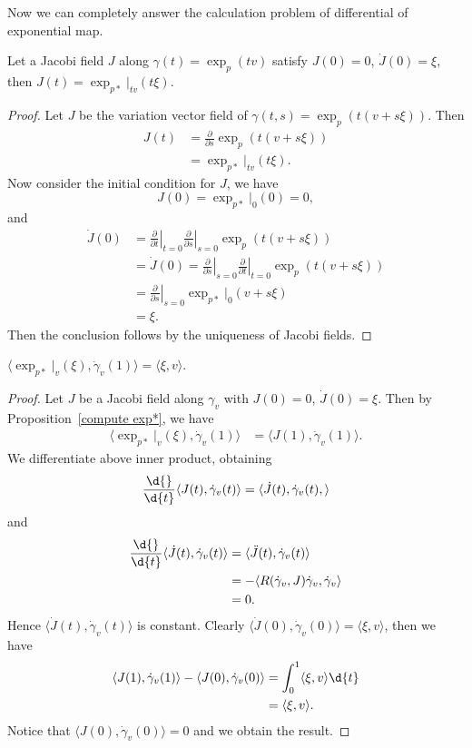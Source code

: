 Now we can completely answer the calculation problem of differential of exponential map.
\begin{prop}\label{compute exp*}
    Let a Jacobi field $J$ along $\gamma(t)=\exp_p(tv)$ satisfy $J(0)=0$, $\dot{J}(0)=\xi$, then $J(t)=\exp_{p*}|_{tv}(t\xi)$.
\end{prop}
\begin{proof}
    Let $J$ be the variation vector field of $\gamma(t,s)=\exp_p(t(v+s\xi))$.
    Then
    \begin{align*}
        J(t)&=\frac{\partial{}}{\partial{s}}\exp_p(t(v+s\xi))\\
        &=\exp_{p*}|_{tv}(t\xi).
    \end{align*}
    Now consider the initial condition for $J$, we have
    \[J(0)=\exp_{p*}|_0(0)=0,\]
    and
    \begin{align*}
        \dot{J}(0)&=\left.\frac{\partial}{\partial{t}}\right|_{t=0}\left.\frac{\partial{}}{\partial{s}}\right|_{s=0}\exp_p(t(v+s\xi))\\
        &=\dot{J}(0)=\left.\frac{\partial}{\partial{s}}\right|_{s=0}\left.\frac{\partial{}}{\partial{t}}\right|_{t=0}\exp_p(t(v+s\xi))\\
        &=\left.\frac{\partial{}}{\partial{s}}\right|_{s=0}\exp_{p*}|_0(v+s\xi)\\
        &=\xi.
    \end{align*}
    Then the conclusion follows by the uniqueness of Jacobi fields.
\end{proof}

\begin{prop}
    $\langle\exp_{p*}|_v(\xi),\dot\gamma_v(1)\rangle=\langle\xi,v\rangle$.
\end{prop}
\begin{proof}
    Let $J$ be a Jacobi field along $\gamma_v$ with $J(0)=0$, $\dot{J}(0)=\xi$.
    Then by Proposition~\ref{compute exp*}, we have
    \begin{align*}
        \langle\exp_{p*}|_v(\xi),\dot\gamma_v(1)\rangle&=\langle J(1),\dot\gamma_v(1)\rangle.
    \end{align*}
    We differentiate above inner product, obtaining
    \[\frac{\d{}}{\d{t}}\langle J(t),\dot\gamma_v(t)\rangle=\langle\dot{J}(t),\dot\gamma_v(t),\rangle\]
    and
    \begin{align*}
        \frac{\d{}}{\d{t}}\langle\dot{J}(t),\dot\gamma_v(t)\rangle&=\langle\ddot{J}(t),\dot\gamma_v(t)\rangle\\
        &=-\langle R(\dot\gamma_v,J)\dot\gamma_v,\dot\gamma_v\rangle\\
        &=0.
    \end{align*}
    Hence $\langle\dot{J}(t),\dot\gamma_v(t)\rangle$ is constant.
    Clearly $\langle\dot{J}(0),\dot\gamma_v(0)\rangle=\langle\xi,v\rangle$, then we have
    \begin{align*}
        \langle J(1),\dot\gamma_v(1)\rangle-\langle J(0),\dot\gamma_v(0)\rangle&=\int_0^1\langle\xi,v\rangle\d{t}\\
        &=\langle\xi,v\rangle.
    \end{align*}
    Notice that $\langle J(0),\dot\gamma_v(0)\rangle=0$ and we obtain the result.
\end{proof}

